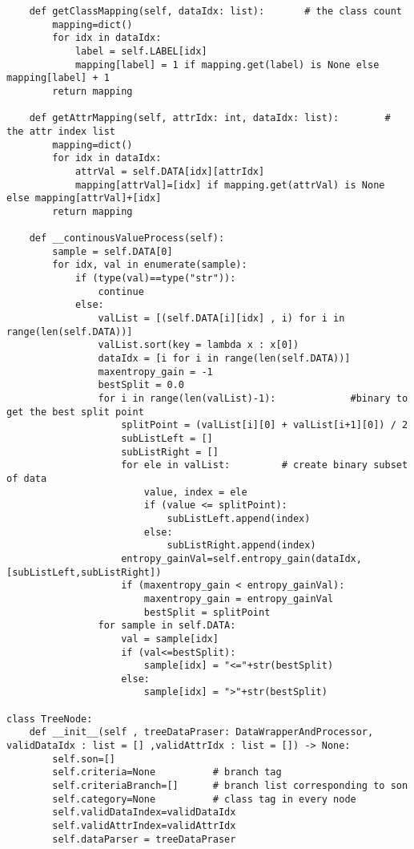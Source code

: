 \documentclass{ctexart}
\begin{document}
\begin{lstlisting}
    def getClassMapping(self, dataIdx: list):       # the class count
        mapping=dict()
        for idx in dataIdx:
            label = self.LABEL[idx]
            mapping[label] = 1 if mapping.get(label) is None else mapping[label] + 1
        return mapping
    
    def getAttrMapping(self, attrIdx: int, dataIdx: list):        # the attr index list
        mapping=dict()
        for idx in dataIdx:
            attrVal = self.DATA[idx][attrIdx]
            mapping[attrVal]=[idx] if mapping.get(attrVal) is None else mapping[attrVal]+[idx]
        return mapping
    
    def __continousValueProcess(self):
        sample = self.DATA[0]
        for idx, val in enumerate(sample):
            if (type(val)==type("str")):
                continue
            else:
                valList = [(self.DATA[i][idx] , i) for i in range(len(self.DATA))]
                valList.sort(key = lambda x : x[0])
                dataIdx = [i for i in range(len(self.DATA))]
                maxentropy_gain = -1
                bestSplit = 0.0
                for i in range(len(valList)-1):             #binary to get the best split point
                    splitPoint = (valList[i][0] + valList[i+1][0]) / 2
                    subListLeft = []
                    subListRight = []
                    for ele in valList:         # create binary subset of data
                        value, index = ele
                        if (value <= splitPoint):
                            subListLeft.append(index)
                        else:
                            subListRight.append(index)
                    entropy_gainVal=self.entropy_gain(dataIdx, [subListLeft,subListRight])
                    if (maxentropy_gain < entropy_gainVal):
                        maxentropy_gain = entropy_gainVal
                        bestSplit = splitPoint
                for sample in self.DATA:
                    val = sample[idx]
                    if (val<=bestSplit):
                        sample[idx] = "<="+str(bestSplit)
                    else:
                        sample[idx] = ">"+str(bestSplit)

class TreeNode:
    def __init__(self , treeDataPraser: DataWrapperAndProcessor, validDataIdx : list = [] ,validAttrIdx : list = []) -> None:
        self.son=[]
        self.criteria=None          # branch tag
        self.criteriaBranch=[]      # branch list corresponding to son
        self.category=None          # class tag in every node
        self.validDataIndex=validDataIdx
        self.validAttrIndex=validAttrIdx
        self.dataParser = treeDataPraser
    

\end{lstlisting}
\end{document}
